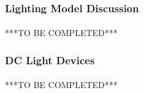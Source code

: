 \subsubsection{Lighting Model Discussion}

\paragraph{}

\newline
***TO BE COMPLETED***


\subsubsection{DC Light Devices}

\paragraph{}
***TO BE COMPLETED***

